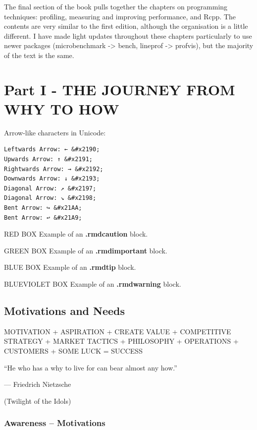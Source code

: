 \documentclass[
]{book}
\begin{document}
The final section of the book pulls together the chapters on programming techniques: profiling, measuring and improving performance, and Rcpp. The contents are very similar to the first edition, although the organisation is a little different. I have made light updates throughout these chapters particularly to use newer packages (microbenchmark -\textgreater{} bench, lineprof -\textgreater{} profvis), but the majority of the text is the same.

\mainmatter

\hypertarget{part-part-i---the-journey-from-why-to-how}{%
\part*{Part I - THE JOURNEY FROM WHY TO HOW}\label{part-part-i---the-journey-from-why-to-how}}


Arrow-like characters in Unicode:

\begin{verbatim}
Leftwards Arrow: ← &#x2190;
Upwards Arrow: ↑ &#x2191;
Rightwards Arrow: → &#x2192;
Downwards Arrow: ↓ &#x2193;
Diagonal Arrow: ↗ &#x2197;
Diagonal Arrow: ↘ &#x2198;
Bent Arrow: ↪ &#x21AA;
Bent Arrow: ↩ &#x21A9;
\end{verbatim}

RED BOX Example of an \textbf{.rmdcaution} block.

GREEN BOX Example of an \textbf{.rmdimportant} block.

BLUE BOX Example of an \textbf{.rmdtip} block.

BLUEVIOLET BOX Example of an \textbf{.rmdwarning} block.

\hypertarget{motivations-and-needs}{%
\chapter{Motivations and Needs}\label{motivations-and-needs}}

{MOTIVATION}
{+}
{ASPIRATION}
{+}
{CREATE VALUE}
{+}
{COMPETITIVE STRATEGY }
{+}
{MARKET TACTICS}
{+}
{PHILOSOPHY}
{+}
{OPERATIONS}
{+}
{CUSTOMERS}
{+}
{SOME LUCK}
{=}
{SUCCESS}

``He who has a why to live for can bear almost any how.''

--- Friedrich Nietzsche

(Twilight of the Idols)

\hypertarget{awareness-motivations}{%
\section{Awareness -- Motivations}\label{awareness-motivations}}
\end{document}
